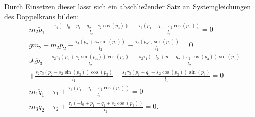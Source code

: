Durch Einsetzen dieser lässt sich ein abschließender Satz an Systemgleichungen des Doppelkrans bilden:
\begin{subequations}
	\begin{flalign}
	&m_{2} \ddot{p}_{1} - \frac{\tau_{4} \left(- l_{0} + p_{1} - q_{2} + s_{2} \cos{\left(p_{3} \right)}\right)}{l_{2}} - \frac{\tau_{3} \left(p_{1} - q_{1} - s_{2} \cos{\left(p_{3} \right)}\right)}{l_{1}} = 0 \label{double_flat_syseq1}\\
	&g m_{2} + m_{2} \ddot{p}_{2} - \frac{\tau_{4} \left(p_{2} + s_{2} \sin{\left(p_{3} \right)}\right)}{l_{2}} - \frac{\tau_{3} \left(p_{2} s_{2} \sin{\left(p_{3} \right)}\right)}{l_{1}} = 0 \label{double_flat_syseq2}\\
	&J_{2} \ddot{p}_{3} - \frac{s_{2} \tau_{4} \left(p_{2} + s_{2} \sin{\left(p_{3} \right)}\right) \cos{\left(p_{3} \right)}}{l_{2}} + \frac{s_{2} \tau_{4} \left(- l_{0} + p_{1} - q_{2} + s_{2} \cos{\left(p_{3} \right)}\right) \sin{\left(p_{3} \right)}}{l_{2}} \nonumber\\
	&+ \frac{s_{2} \tau_{3} \left(p_{2} - s_{2} \sin{\left(p_{3} \right)}\right) \cos{\left(p_{3} \right)}}{l_{1}} - \frac{s_{2} \tau_{3} \left(p_{1} - q_{1} - s_{2} \cos{\left(p_{3} \right)}\right) \sin{\left(p_{3} \right)}}{l_{1}} = 0 \label{double_flat_syseq3}\\
	&m_{1} \ddot{q}_{1} - \tau_{1} + \frac{\tau_{3} \left(p_{1} - q_{1} - s_{2} \cos{\left(p_{3} \right)}\right)}{l_{1}} = 0 \label{double_flat_syseq4}\\
	&m_{3} \ddot{q}_{2} - \tau_{2} + \frac{\tau_{4} \left(- l_{0} + p_{1} - q_{2} + s_{2} \cos{\left(p_{3} \right)}\right)}{l_{2}} = 0\label{double_flat_syseq5}.
	\end{flalign}
\end{subequations}

